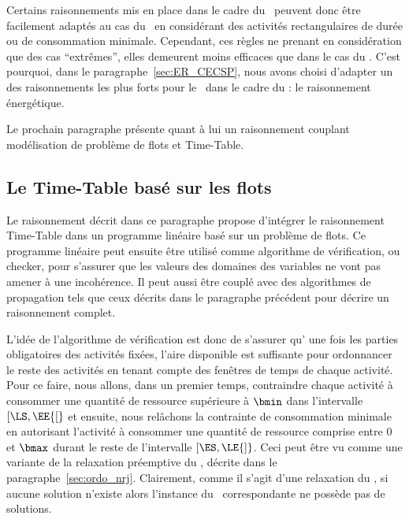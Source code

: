 Certains raisonnements mis en place dans le cadre du \CUSP~peuvent
donc être facilement adaptés au cas du \CECSP~en considérant des
activités rectangulaires de durée ou de consommation
minimale. Cependant, ces règles ne prenant en considération que des
cas ``extrêmes'', elles demeurent moins efficaces que dans le cas du
\CUSP. C'est pourquoi, dans le paragraphe~\ref{sec:ER_CECSP}, nous
avons choisi d'adapter un des raisonnements les plus forts pour le
\CUSP~dans le cadre du \CECSP: le raisonnement énergétique.

Le prochain paragraphe présente quant à lui un raisonnement couplant
modélisation de problème de flots et Time-Table. 

\subsection{Le Time-Table basé sur les flots}
\label{sec:TTFlot_CECSP}
Le raisonnement décrit dans ce paragraphe propose d'intégrer le
raisonnement Time-Table dans un programme linéaire basé sur un
problème de flots. Ce programme linéaire peut ensuite être utilisé
comme algorithme de vérification, ou checker, pour s'assurer que les
valeurs des domaines des variables ne vont pas amener à une
incohérence. Il peut aussi être couplé avec des algorithmes de
propagation tels que ceux décrits dans le paragraphe précédent pour
décrire un raisonnement complet. 

L'idée de l'algorithme de vérification est donc de s'assurer qu' une
fois les parties obligatoires des activités fixées, l'aire disponible
est suffisante pour ordonnancer le reste des activités en tenant
compte des fenêtres de temps de chaque activité. Pour ce faire, nous
allons, dans un premier temps, contraindre chaque activité à consommer
une quantité de ressource supérieure à $\bmin$ dans l'intervalle
$[\LS,\EE{[}$ et ensuite, nous relâchons la contrainte de consommation
minimale en autorisant l'activité à consommer une quantité de
ressource comprise entre $0$ et $\bmax$ durant le reste de l'intervalle
$[\ES,\LE{]}$. Ceci peut être vu comme une variante de la relaxation
préemptive du \CECSP, décrite dans le paragraphe~\ref{sec:ordo_nrj}. 
Clairement, comme il s'agit d'une relaxation du \CECSP, si aucune
solution n'existe alors l'instance du \CECSP~correspondante
ne possède pas de solutions. 

